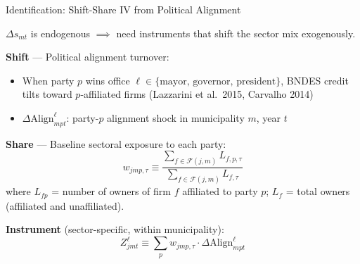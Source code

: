 \documentclass[aspectratio=169,11pt]{beamer}
\newcommand{\Align}{\mathrm{Align}}
\begin{document}
\begin{frame}[allowframebreaks]{Identification: Shift-Share IV from Political Alignment}

$\Delta s_{mt}$ is endogenous $\implies$ need instruments that shift the sector mix exogenously.

\bigskip

\textbf{Shift} --- Political alignment turnover:
\begin{itemize}
    \item When party $p$ wins office $\ell \in \{\text{mayor, governor, president}\}$, BNDES credit tilts toward $p$-affiliated firms (Lazzarini et al.~2015, Carvalho 2014)
    \item $\Delta\Align^\ell_{mpt}$: party-$p$ alignment shock in municipality $m$, year $t$
\end{itemize}

\medskip

\textbf{Share} --- Baseline sectoral exposure to each party:
\begin{equation*}
    w_{jmp,\tau} \equiv \frac{\sum_{f \in \mathcal{F}(j,m)} L_{f,p,\tau}}
    {\sum_{f \in \mathcal{F}(j,m)} L_{f,\tau}}
\end{equation*}
where $L_{fp}$ = number of owners of firm $f$ affiliated to party $p$; $L_f$ = total owners (affiliated and unaffiliated).

\textbf{Instrument} (sector-specific, within municipality):
\begin{equation*}
    Z^\ell_{jmt} \equiv \sum_p w_{jmp,\tau} \cdot \Delta\Align^\ell_{mpt}
\end{equation*}

\end{frame}
\end{document}
